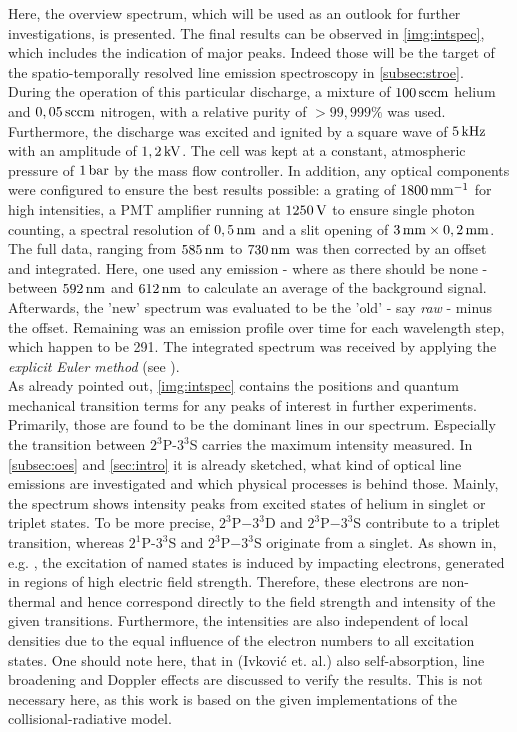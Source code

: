 \documentclass[a4paper,10pt,twoside]{article}
\newcommand{\tilt}[1]{\textit{#1}}
\begin{document}
			Here, the overview spectrum, which will be used as an outlook for further investigations, is presented. The final results can be observed in \autoref{img:intspec}, which includes the indication of major peaks. Indeed those will be the target of the spatio-temporally resolved line emission spectroscopy in \autoref{subsec:stroe}.\\
			During the operation of this particular discharge, a mixture of $\unit[100]{sccm}$ helium and $\unit[0,05]{sccm}$ nitrogen, with a relative purity of $>99,999\%$ was used. Furthermore, the discharge was excited and ignited by a square wave of $\unit[5]{kHz}$ with an amplitude of $\unit[1,2]{kV}$. The cell was kept at a constant, atmospheric pressure of $\unit[1]{bar}$ by the mass flow controller. In addition, any optical components were configured to ensure the best results possible: a grating of $\unit[1800]{mm^{-1}}$ for high intensities, a PMT amplifier running at $\unit[1250]{V}$ to ensure single photon counting, a spectral resolution of $\unit[0,5]{nm}$ and a slit opening of $\unit[3]{mm}\times\unit[0,2]{mm}$.\\
			The full data, ranging from $\unit[585]{nm}$ to $\unit[730]{nm}$ was then corrected by an offset and integrated. Here, one used any emission - where as there should be none - between $\unit[592]{nm}$ and $\unit[612]{nm}$ to calculate an average of the background signal. Afterwards, the 'new' spectrum was evaluated to be the 'old' - say \tilt{raw} - minus the offset. Remaining was an emission profile over time for each wavelength step, which happen to be 291. The integrated spectrum was received by applying the \tilt{explicit Euler method} (see \cite{Wiki:Euler}).\\
			As already pointed out, \autoref{img:intspec} contains the positions and quantum mechanical transition terms for any peaks of interest in further experiments. Primarily, those are found to be the dominant lines in our spectrum. Especially the transition between $2^3$P-$3^3$S carries the maximum intensity measured. In \autoref{subsec:oes} and \autoref{sec:intro} it is already sketched, what kind of optical line emissions are investigated and which physical processes is behind those. Mainly, the spectrum shows intensity peaks from excited states of helium in singlet or triplet states. To be more precise, $2^3$P$-3^3$D and $2^3$P$-3^3$S contribute to a triplet transition, whereas $2^1$P-$3^3$S and $2^3$P$-3^3$S originate from a singlet. As shown in, e.g. \cite{linratio1_14}, the excitation of named states is induced by impacting electrons, generated in regions of high electric field strength. Therefore, these electrons are non-thermal and hence correspond directly to the field strength and intensity of the given transitions. Furthermore, the intensities are also independent of local densities due to the equal influence of the electron numbers to all excitation states. One should note here, that in \cite{linratio1_14} (Ivkovi{\'c} et. al.) also self-absorption, line broadening and Doppler effects are discussed to verify the results. This is not necessary here, as this work is based on the given implementations of the collisional-radiative model.
			
\end{document}

